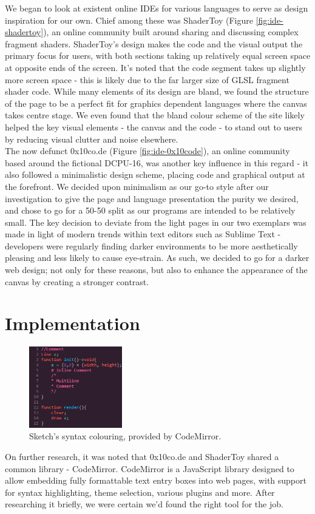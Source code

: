\documentclass{l3proj}
\begin{document}
We began to look at existent online IDEs for various languages to serve as design inspiration for our own. Chief among these was ShaderToy (Figure \ref{fig:ide-shadertoy}), an online community built around sharing and discussing complex fragment shaders. ShaderToy's design makes the code and the visual output the primary focus for users, with both sections taking up relatively equal screen space at opposite ends of the screen. It's noted that the code segment takes up slightly more screen space - this is likely due to the far larger size of GLSL fragment shader code. While many elements of its design are bland, we found the structure of the page to be a perfect fit for graphics dependent languages where the canvas takes centre stage. We even found that the bland colour scheme of the site likely helped the key visual elements - the canvas and the code - to stand out to users by reducing visual clutter and noise elsewhere.\\

The now defunct 0x10co.de (Figure \ref{fig:ide-0x10code}), an online community based around the fictional DCPU-16, was another key influence in this regard - it also followed a minimalistic design scheme, placing code and graphical output at the forefront. We decided upon minimalism as our go-to style after our investigation to give the page and language presentation the purity we desired, and chose to go for a 50-50 split as our programs are intended to be relatively small. The key decision to deviate from the light pages in our two exemplars was made in light of modern trends within text editors such as Sublime Text - developers were regularly finding darker environments to be more aesthetically pleasing and less likely to cause eye-strain. As such, we decided to go for a darker web design; not only for these reasons, but also to enhance the appearance of the canvas by creating a stronger contrast.

\section{Implementation}
\label{ide-impl}
\begin{figure}
  \centering
  \includegraphics[width=0.36\textwidth]{images/sketch-syntax}
  \caption{Sketch's syntax colouring, provided by CodeMirror.}
  \label{fig:ide-syntax}
\end{figure}
On further research, it was noted that 0x10co.de and ShaderToy shared a common library - CodeMirror. CodeMirror is a JavaScript library designed to allow embedding fully formattable text entry boxes into web pages, with support for syntax highlighting, theme selection, various plugins and more. After researching it briefly, we were certain we'd found the right tool for the job.
\end{document}
